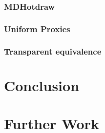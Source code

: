 \documentclass{uvamscse}
\begin{document}
\subsection{MDHotdraw}\label{JHotdraw}

\subsection{Uniform Proxies}\label{Uniform Proxies}

\subsection{Transparent equivalence}\label{Transparent equivalence}

\chapter{Conclusion}\label{Conclusion}

\chapter{Further Work}\label{Further Work}

\begin{appendix}
\end{appendix}

{%


}
\end{document}

